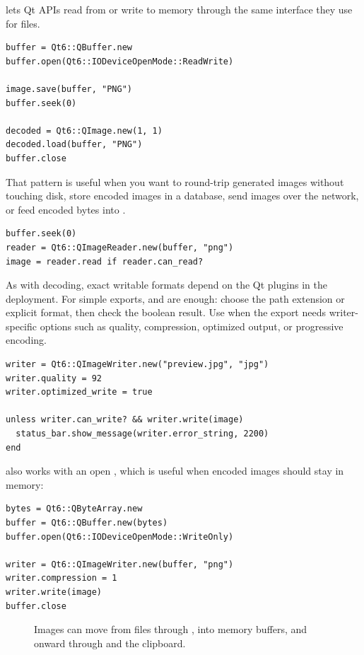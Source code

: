  lets Qt APIs read from or write to memory through the same  interface they use for files.

\begin{lstlisting}[style=crystal]
buffer = Qt6::QBuffer.new
buffer.open(Qt6::IODeviceOpenMode::ReadWrite)

image.save(buffer, "PNG")
buffer.seek(0)

decoded = Qt6::QImage.new(1, 1)
decoded.load(buffer, "PNG")
buffer.close
\end{lstlisting}

That pattern is useful when you want to round-trip generated images without touching disk, store encoded images in a database, send images over the network, or feed encoded bytes into .

\begin{lstlisting}[style=crystal]
buffer.seek(0)
reader = Qt6::QImageReader.new(buffer, "png")
image = reader.read if reader.can_read?
\end{lstlisting}

As with decoding, exact writable formats depend on the Qt plugins in the deployment. For simple exports,  and  are enough: choose the path extension or explicit format, then check the boolean result. Use  when the export needs writer-specific options such as quality, compression, optimized output, or progressive encoding.

\begin{lstlisting}[style=crystal]
writer = Qt6::QImageWriter.new("preview.jpg", "jpg")
writer.quality = 92
writer.optimized_write = true

unless writer.can_write? && writer.write(image)
  status_bar.show_message(writer.error_string, 2200)
end
\end{lstlisting}

 also works with an open , which is useful when encoded images should stay in memory:

\begin{lstlisting}[style=crystal]
bytes = Qt6::QByteArray.new
buffer = Qt6::QBuffer.new(bytes)
buffer.open(Qt6::IODeviceOpenMode::WriteOnly)

writer = Qt6::QImageWriter.new(buffer, "png")
writer.compression = 1
writer.write(image)
buffer.close
\end{lstlisting}

\begin{figure}[htbp]
  \centering
  \caption{Images can move from files through , into memory buffers, and onward through  and the clipboard.}
\end{figure}

